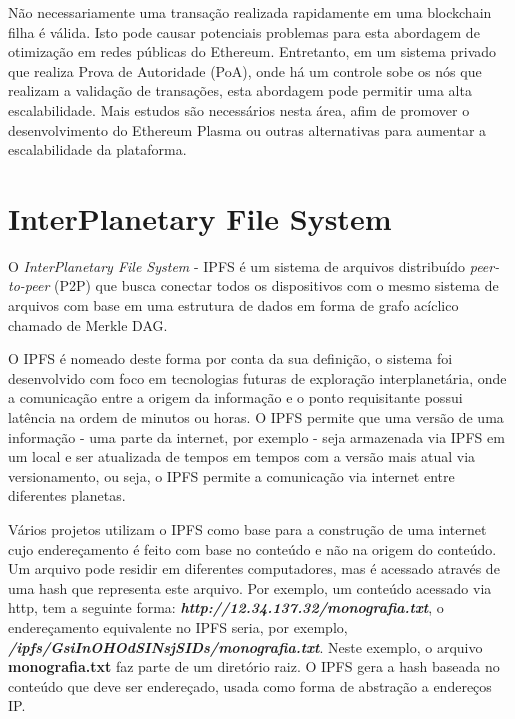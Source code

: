 \documentclass[tcc,capa]{texufpel}
\begin{document}
    Não necessariamente uma transação realizada rapidamente em uma blockchain filha é válida. Isto pode causar potenciais problemas para esta abordagem de otimização em redes públicas do Ethereum. Entretanto, em um sistema privado que realiza Prova de Autoridade (PoA), onde há um controle sobe os nós que realizam a validação de transações, esta abordagem pode permitir uma alta escalabilidade. Mais estudos são necessários nesta área, afim de promover o desenvolvimento do Ethereum Plasma ou outras alternativas para aumentar a escalabilidade da plataforma.

    
    
\section{InterPlanetary File System}

    O \textit{InterPlanetary File System} - IPFS é um sistema de arquivos distribuído \textit{peer-to-peer} (P2P) que busca conectar todos os dispositivos com o mesmo sistema de arquivos com base em uma estrutura de dados em forma de grafo acíclico chamado de Merkle DAG.
    
    O IPFS é nomeado deste forma por conta da sua definição, o sistema foi desenvolvido com foco em tecnologias futuras de exploração interplanetária, onde a comunicação entre a origem da informação e o ponto requisitante possui latência na ordem de minutos ou horas. O IPFS permite que uma versão de uma informação - uma parte da internet, por exemplo - seja armazenada via IPFS em um local e ser atualizada de tempos em tempos com a versão mais atual via versionamento, ou seja, o IPFS permite a comunicação via internet entre diferentes planetas.
    
    Vários projetos utilizam o IPFS como base para a construção de uma internet cujo endereçamento é feito com base no conteúdo e não na origem do conteúdo. Um arquivo pode residir em diferentes computadores, mas é acessado através de uma hash que representa este arquivo. Por exemplo, um conteúdo acessado via http, tem a seguinte forma: \textbf{\textit{http://12.34.137.32/monografia.txt}}, o endereçamento equivalente no IPFS seria, por exemplo, \textbf{\textit{/ipfs/GsiInOHOdSINsjSIDs/monografia.txt}}. Neste exemplo, o arquivo \textbf{monografia.txt} faz parte de um diretório raiz. O IPFS gera a hash baseada no conteúdo que deve ser endereçado, usada como forma de abstração a endereços IP.
    
\end{document}

